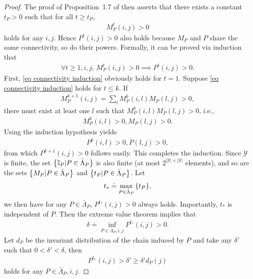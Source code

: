 \documentclass[twoside,11pt]{article}
\newcommand{\fY}{\mathcal{Y}}
\newcommand{\ny}{{|\fY|}}
\numberwithin{assucounter}{section}
\begin{document}
\begin{proof}
  The proof of Proposition~1.7 of \citet{levin2017markov} then asserts that there exists a constant $t_P > 0$ such that for all $t \geq t_P$,
  \begin{align}
      M^t_P(i, j) > 0
  \end{align}
  holds for any $i, j$.
  Hence $P^t(i, j) > 0$ also holds because $M_P$ and $P$ share the same connectivity, so do their powers.
  Formally, it can be proved via induction that 
  \begin{align}
    \label{eq connectivity induction}
    \forall t \geq 1, i, j, \, M_P^t(i, j) > 0 \implies P^t(i, j) > 0.
  \end{align}
  First, \eqref{eq connectivity induction} obviously holds for $t=1$.
  Suppose \eqref{eq connectivity induction} holds for $t \leq k$.
  If
  \begin{align}
    M_P^{k+1}(i, j) = \sum_l M_P^k(i, l) M_P(l, j) > 0,
  \end{align}
  there must exist at least one $l$ such that $M_P^k(i, l) M_P(l, j) > 0$,
  i.e.,
  \begin{align}
    M_P^k(i, l) > 0, M_P(l, j) > 0.
  \end{align}
  Using the induction hypothesis yields
  \begin{align}
    P^k(i, l) > 0, P(l, j) > 0,
  \end{align}
  from which $P^{k+1}(i, j) > 0$ follows easily.
  This completes the induction.
  Since $\fY$ is finite,
  the set $\qty{\mathbb{I}_P | P \in \bar \Lambda_P}$ is also finite (at most $2^{\ny \times \ny}$ elements),
  and so are the sets $\qty{M_P | P \in \bar \Lambda_P}$ and $\qty{t_P | P \in \bar \Lambda_P}$.
  Let 
  \begin{align}
      t_* \doteq \max_{P \in \bar \Lambda_P}\qty{t_P},
  \end{align}
  we then have for any $P \in \bar \Lambda_P$,
  $P^{t_*} (i, j) > 0$ always holds. 
  Importantly, $t_*$ is independent of $P$.
  Then the extreme value theorem implies that 
  \begin{align}
      \delta \doteq \inf_{P \in \bar \Lambda_P, i, j} P^{t_*}(i, j) > 0.
  \end{align}
  Let $d_P$ be the invariant distribution of the chain induced by $P$
  and take any $\delta'$ such that $0 < \delta' < \delta$,
  then
  \begin{align}
      P^{t_*}(i, j) > \delta' \geq \delta' d_P(j) 
  \end{align}
  holds for any $P \in \bar \Lambda_P, i, j$.


\end{proof}
\end{document}
